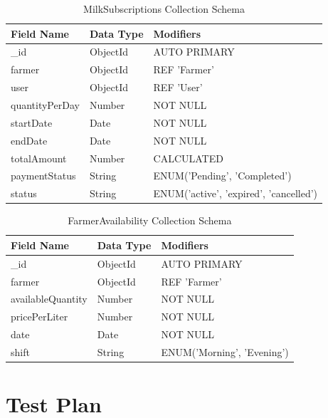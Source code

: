 \documentclass[12pt,a4paper]{report}
\begin{document}
\vspace{0.4cm}
\begin{table}[htbp]
\centering
\begin{tabular}{|p{4cm}|p{3cm}|p{8cm}|}
\hline
\textbf{Field Name} & \textbf{Data Type} & \textbf{Modifiers} \\ \hline
\_id & ObjectId & AUTO PRIMARY \\ \hline
farmer & ObjectId & REF 'Farmer' \\ \hline
user & ObjectId & REF 'User' \\ \hline
quantityPerDay & Number & NOT NULL \\ \hline
startDate & Date & NOT NULL \\ \hline
endDate & Date & NOT NULL \\ \hline
totalAmount & Number & CALCULATED \\ \hline
paymentStatus & String & ENUM('Pending', 'Completed') \\ \hline
status & String & ENUM('active', 'expired', 'cancelled') \\ \hline
\end{tabular}
\caption{MilkSubscriptions Collection Schema}
\end{table}
\vspace{0.4cm}

\vspace{0.4cm}
\begin{table}[htbp]
\centering
\begin{tabular}{|p{4cm}|p{3cm}|p{8cm}|}
\hline
\textbf{Field Name} & \textbf{Data Type} & \textbf{Modifiers} \\ \hline
\_id & ObjectId & AUTO PRIMARY \\ \hline
farmer & ObjectId & REF 'Farmer' \\ \hline
availableQuantity & Number & NOT NULL \\ \hline
pricePerLiter & Number & NOT NULL \\ \hline
date & Date & NOT NULL \\ \hline
shift & String & ENUM('Morning', 'Evening') \\ \hline
\end{tabular}
\caption{FarmerAvailability Collection Schema}
\end{table}
\vspace{0.4cm}


\section{Test Plan}
\end{document}
